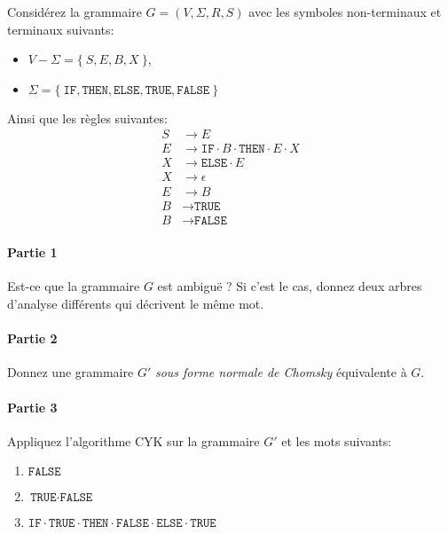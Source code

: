 \documentclass[12pt,french,a4paper]{article}
\begin{document}
\begin{question}

Considérez la grammaire $G = (V, \Sigma, R, S)$ avec les symboles non-terminaux et terminaux suivants:
\begin{itemize}
\item $V - \Sigma = \{\ S, E, B, X\ \}$,
\item $\Sigma = \{\ \texttt{IF}, \texttt{THEN}, \texttt{ELSE}, \texttt{TRUE}, \texttt{FALSE}\ \}$
\end{itemize}
Ainsi que les règles suivantes:
\begin{align*}
S &\to E\\
E &\to \texttt{IF} \cdot B \cdot \texttt{THEN} \cdot E \cdot X\\
X &\to \texttt{ELSE} \cdot E\\
X &\to \epsilon\\
E &\to B\\
B &\to \texttt{TRUE}\\
B &\to \texttt{FALSE}
\end{align*}

\paragraph{Partie 1}

Est-ce que la grammaire $G$ est ambiguë ?
Si c'est le cas, donnez deux arbres d'analyse différents qui décrivent le même mot.

\paragraph{Partie 2}

Donnez une grammaire $G'$ \textit{sous forme normale de Chomsky} équivalente à $G$.

\paragraph{Partie 3}

Appliquez l'algorithme CYK sur la grammaire $G'$ et les mots suivants:
\begin{enumerate}
\item $\texttt{FALSE}$
\item $\texttt{TRUE} \cdot \texttt{FALSE}$
\item $\texttt{IF} \cdot \texttt{TRUE} \cdot \texttt{THEN} \cdot \texttt{FALSE} \cdot \texttt{ELSE} \cdot \texttt{TRUE}$
\end{enumerate}

\end{question}
\end{document}
